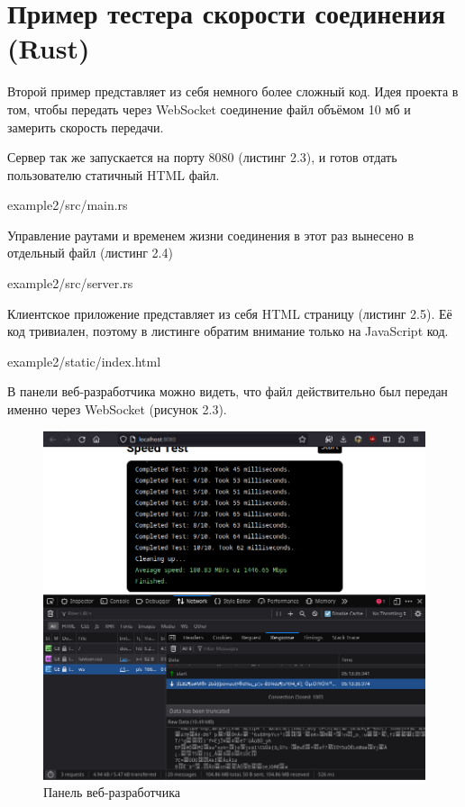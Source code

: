 \section{Пример тестера скорости соединения (Rust)}

Второй пример представляет из себя немного более сложный код. Идея проекта в том, чтобы передать через WebSocket соединение файл объёмом 10 мб и замерить скорость передачи.

Сервер так же запускается на порту 8080 (листинг 2.3), и готов отдать пользователю статичный HTML файл.


{example2/src/main.rs}

Управление раутами и временем жизни соединения в этот раз вынесено в отдельный файл (листинг 2.4)


{example2/src/server.rs}

Клиентское приложение представляет из себя HTML страницу (листинг 2.5). Её код тривиален, поэтому в листинге обратим внимание только на JavaScript код.


{example2/static/index.html}

В панели веб-разработчика можно видеть, что файл действительно был передан именно через WebSocket (рисунок 2.3).

\begin{figure}[H]
\centering
\includegraphics[scale=0.6]{res/browser2}
\caption{Панель веб-разработчика}
\end{figure}
